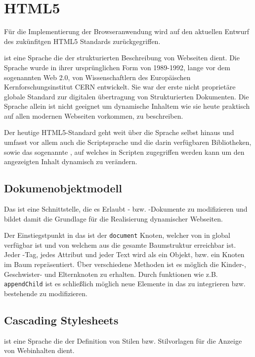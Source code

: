 \section{HTML5}

Für die Implementierung der Browseranwendung wird auf den aktuellen Entwurf des  zukünfitgen HTML5
Standards zurückgegriffen. \cite{html5}

 ist eine Sprache die der strukturierten  Beschreibung von Webseiten dient. Die Sprache
wurde in ihrer ursprünglichen Form  von 1989-1992, lange vor dem sogenannten Web 2.0, von
Wissenschaftlern des  Europäischen Kernforschungsinstitut CERN entwickelt. Sie war der erste nicht
proprietäre globale Standard zur digitalen übertragung von Strukturierten  Dokumenten. Die Sprache
 allein ist nicht geeignet um dynamische Inhaltem  wie sie heute praktisch auf allen
modernen Webseiten vorkommen, zu beschreiben.

Der heutige HTML5-Standard geht weit über die Sprache  selbst hinaus und  umfasst vor
allem auch die Scriptsprache  und die darin verfügbaren  Bibliotheken, sowie das
sogenannte , auf welches in  Scripten zugegriffen werden kann um den angezeigten Inhalt
dynamisch zu  verändern.

\subsection{Dokumenobjektmodell}

Das  ist eine Schnittstelle, die es Erlaubt - bzw. -Dokumente zu
modifizieren und bildet damit die Grundlage für die Realisierung dynamischer Webseiten.

Der Einstiegstpunkt in das  ist der \texttt{document} Knoten, welcher von in 
global verfügbar ist und von welchem aus die gesamte Baumstruktur erreichbar ist. Jeder
-Tag, jedes Attribut und jeder Text wird als ein Objekt, bzw. ein Knoten im Baum
repräsentiert. Über verschiedene Methoden ist es möglich die Kinder-, Geschwister- und Elternknoten
zu erhalten. Durch funktionen wie z.B. \texttt{appendChild} ist es schließlich möglich neue Elemente
in das  zu integrieren bzw. bestehende zu modifizieren. \cite{dom}

\subsection{Cascading Stylesheets}

 ist eine Sprache die der Definition von  Stilen bzw. Stilvorlagen für die Anzeige von
Webinhalten dient.

